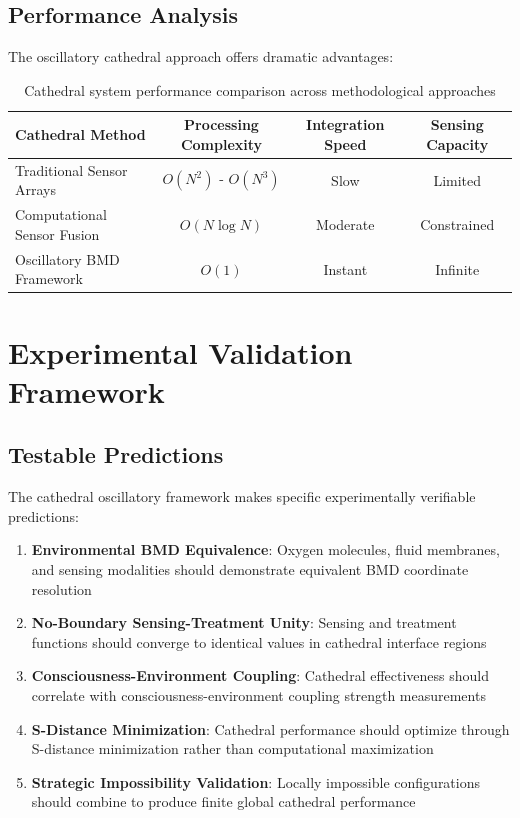 \documentclass[12pt,a4paper]{article}
\begin{document}
\subsection{Performance Analysis}

The oscillatory cathedral approach offers dramatic advantages:

\begin{table}[H]
\centering
\begin{tabular}{lccc}
\toprule
Cathedral Method & Processing Complexity & Integration Speed & Sensing Capacity \\
\midrule
Traditional Sensor Arrays & $O(N^2)$ - $O(N^3)$ & Slow & Limited \\
Computational Sensor Fusion & $O(N \log N)$ & Moderate & Constrained \\
Oscillatory BMD Framework & $O(1)$ & Instant & Infinite \\
\bottomrule
\end{tabular}
\caption{Cathedral system performance comparison across methodological approaches}
\end{table}

\section{Experimental Validation Framework}

\subsection{Testable Predictions}

The cathedral oscillatory framework makes specific experimentally verifiable predictions:

\begin{enumerate}
\item \textbf{Environmental BMD Equivalence}: Oxygen molecules, fluid membranes, and sensing modalities should demonstrate equivalent BMD coordinate resolution
\item \textbf{No-Boundary Sensing-Treatment Unity}: Sensing and treatment functions should converge to identical values in cathedral interface regions
\item \textbf{Consciousness-Environment Coupling}: Cathedral effectiveness should correlate with consciousness-environment coupling strength measurements
\item \textbf{S-Distance Minimization}: Cathedral performance should optimize through S-distance minimization rather than computational maximization
\item \textbf{Strategic Impossibility Validation}: Locally impossible configurations should combine to produce finite global cathedral performance
\end{enumerate}
\end{document}
